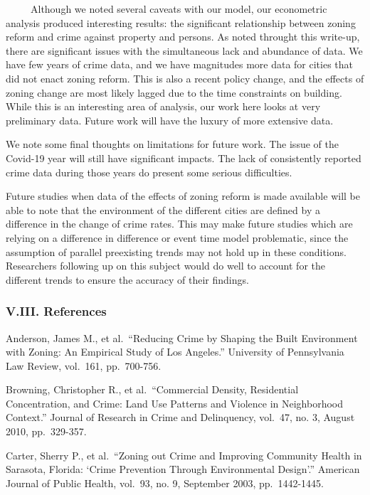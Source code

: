 \documentclass[
  12pt,
]{article}
\begin{document}
\setlength\parindent{24pt}

~~~~~Although we noted several caveats with our model, our econometric
analysis produced interesting results: the significant relationship
between zoning reform and crime against property and persons. As noted
throught this write-up, there are significant issues with the
simultaneous lack and abundance of data. We have few years of crime
data, and we have magnitudes more data for cities that did not enact
zoning reform. This is also a recent policy change, and the effects of
zoning change are most likely lagged due to the time constraints on
building. While this is an interesting area of analysis, our work here
looks at very preliminary data. Future work will have the luxury of more
extensive data.

We note some final thoughts on limitations for future work. The issue of
the Covid-19 year will still have significant impacts. The lack of
consistently reported crime data during those years do present some
serious difficulties.

Future studies when data of the effects of zoning reform is made
available will be able to note that the environment of the different
cities are defined by a difference in the change of crime rates. This
may make future studies which are relying on a difference in difference
or event time model problematic, since the assumption of parallel
preexisting trends may not hold up in these conditions. Researchers
following up on this subject would do well to account for the different
trends to ensure the accuracy of their findings.

\hypertarget{v.iii.-references}{%
\subsubsection{V.III. References}\label{v.iii.-references}}

Anderson, James M., et al.~``Reducing Crime by Shaping the Built
Environment with Zoning: An Empirical Study of Los Angeles.'' University
of Pennsylvania Law Review, vol.~161, pp.~700-756.

Browning, Christopher R., et al.~``Commercial Density, Residential
Concentration, and Crime: Land Use Patterns and Violence in Neighborhood
Context.'' Journal of Research in Crime and Delinquency, vol.~47, no. 3,
August 2010, pp.~329-357.

Carter, Sherry P., et al.~``Zoning out Crime and Improving Community
Health in Sarasota, Florida: `Crime Prevention Through Environmental
Design'.'' American Journal of Public Health, vol.~93, no. 9, September
2003, pp.~1442-1445.
\end{document}
